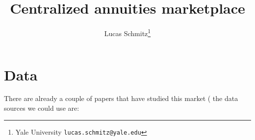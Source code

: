\documentclass[12pt]{article}
\theoremstyle{plain}
\theoremstyle{plain}
\begin{document}
 

\newpage
 \title{{\Large Centralized annuities marketplace}}
\author{Lucas Schmitz\thanks{Yale University \texttt{lucas.schmitz@yale.edu}}} 
\date{}
\maketitle


%



\vspace{3cm}








\section{Data}
There are already a couple of papers that have studied this market (\cite{boehm_intermediation_2024,illanes_retirement_2019,alcalde_intermediary_nodate} the data sources we could use are: 
\end{document}
